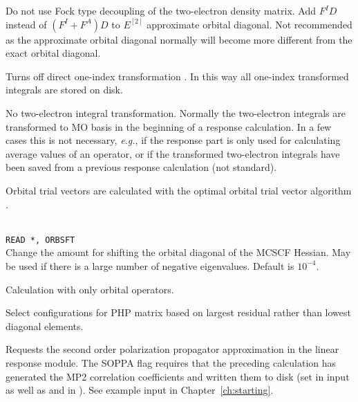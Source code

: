 \begin{description}
\item{}
Do not use Fock type decoupling of the two-electron density matrix.
Add $F^ID$ instead of $(F^I+F^A)D$ to $E^{[2]}$ approximate
orbital diagonal. Not recommended as the approximate orbital diagonal
normally will become more different from the exact orbital diagonal.

\item{}
Turns off direct one-index transformation \cite{ovhahjajjcc15}.
In this way all one-index transformed integrals are stored on disk.

\item{}
No two-electron integral transformation. Normally the two-electron integrals are
transformed to MO basis in the beginning of a response calculation. In a few cases
this is not necessary, {\it e.g.\/}, if the response part is only used for
calculating average values of an operator, or if the transformed two-electron
integrals have been saved from a previous response calculation (not standard).

\item{}
Orbital trial vectors are calculated with the optimal orbital
trial vector
algorithm \cite{tuhjahjajpjjcp84}.

\item{}\\
\verb|READ *, ORBSFT|\\
Change the amount for shifting the orbital
diagonal of the MCSCF Hessian.
May be used if there is a large number of negative eigenvalues.
Default is $10^{-4}$.

\item{}
Calculation with only orbital operators.

\item{}
Select configurations for PHP matrix based on largest residual
rather than lowest diagonal elements.


\item{}
Requests the second order polarization propagator approximation
in the linear response module.
The SOPPA
flag requires that
the preceding {\sir} calculation has generated the MP2 correlation
coefficients and written them to disk (set  in 
input as well as  and  in ). See
example input in Chapter~\ref{ch:starting}.


\end{description}
